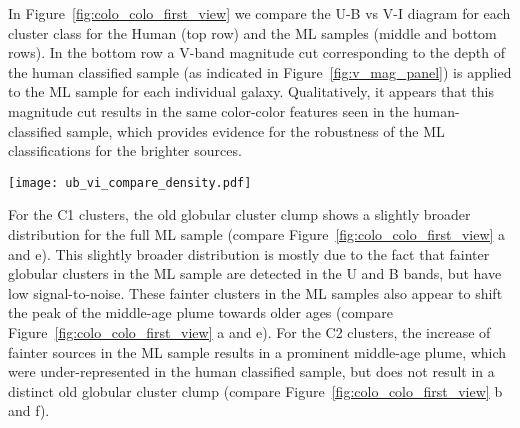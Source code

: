 \documentclass[linenumbers]{aastex63}
\begin{document}
In Figure~\ref{fig:colo_colo_first_view} we compare the U-B vs V-I diagram for each cluster class for the Human (top row) and the ML samples (middle and bottom rows).
In the bottom row a V-band magnitude cut corresponding to the depth of the human classified sample (as indicated in Figure~\ref{fig:v_mag_panel}) is applied to the ML sample for each individual galaxy. Qualitatively, it appears that this magnitude cut results in the same color-color features seen in the human-classified sample, which provides evidence for the robustness of the ML classifications for the brighter sources. 
%
\begin{figure*} 
\texttt{[image: ub\_vi\_compare\_density.pdf]}
 \caption{Color-color diagrams for the Human cluster sample (top row) and the ML cluster sample (middle and bottom rows). In the middle row we show all ML classified clusters, whereas the bottom row only shows ML classified clusters up to the same V-band magnitude for each target as detected for the human sample. The individual V-band cuts are estimated with the maximal detected magnitude as presented in Figure~\ref{fig:v_mag_panel}. Cluster classes 1, 2, 1+2 and class 3 compact associations are shown individually in each column from left to right, respectively. Clusters are represented by black dots and in crowded regions by a Gaussian-smoothed heat map indicating the relative density.}
 \label{fig:colo_colo_first_view}
\end{figure*}
%


For the C1 clusters, the old globular cluster clump shows a slightly broader distribution for the full ML sample (compare Figure~\ref{fig:colo_colo_first_view} a and e). This slightly broader distribution is mostly due to the fact that fainter globular clusters in the ML sample are detected in the U and B bands, but have low signal-to-noise. %
These fainter clusters in the ML samples also appear to shift the peak of the middle-age plume towards older ages (compare Figure~\ref{fig:colo_colo_first_view} a and e).   For the C2 clusters, the increase of fainter sources in the ML sample results in a prominent middle-age plume, which were under-represented in the human classified sample, but does not result in a distinct old globular cluster clump (compare Figure~\ref{fig:colo_colo_first_view} b and f).
\end{document}
